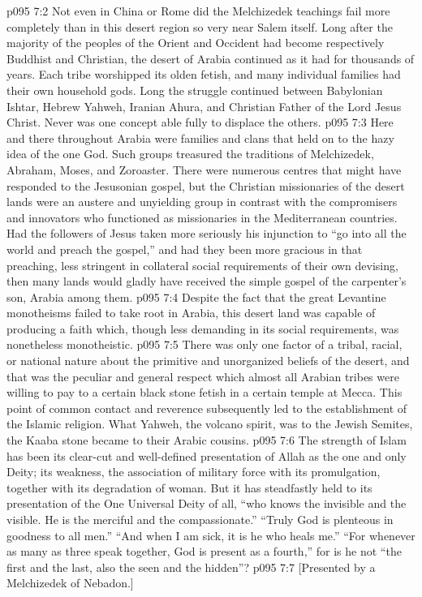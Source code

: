 \vs p095 7:2 Not even in China or Rome did the Melchizedek teachings fail more completely than in this desert region so very near Salem itself. Long after the majority of the peoples of the Orient and Occident had become respectively Buddhist and Christian, the desert of Arabia continued as it had for thousands of years. Each tribe worshipped its olden fetish, and many individual families had their own household gods. Long the struggle continued between Babylonian Ishtar, Hebrew Yahweh, Iranian Ahura, and Christian Father of the Lord Jesus Christ. Never was one concept able fully to displace the others.
\vs p095 7:3 Here and there throughout Arabia were families and clans that held on to the hazy idea of the one God. Such groups treasured the traditions of Melchizedek, Abraham, Moses, and Zoroaster. There were numerous centres that might have responded to the Jesusonian gospel, but the Christian missionaries of the desert lands were an austere and unyielding group in contrast with the compromisers and innovators who functioned as missionaries in the Mediterranean countries. Had the followers of Jesus taken more seriously his injunction to “go into all the world and preach the gospel,” and had they been more gracious in that preaching, less stringent in collateral social requirements of their own devising, then many lands would gladly have received the simple gospel of the carpenter’s son, Arabia among them.
\vs p095 7:4 Despite the fact that the great Levantine monotheisms failed to take root in Arabia, this desert land was capable of producing a faith which, though less demanding in its social requirements, was nonetheless monotheistic.
\vs p095 7:5 There was only one factor of a tribal, racial, or national nature about the primitive and unorganized beliefs of the desert, and that was the peculiar and general respect which almost all Arabian tribes were willing to pay to a certain black stone fetish in a certain temple at Mecca. This point of common contact and reverence subsequently led to the establishment of the Islamic religion. What Yahweh, the volcano spirit, was to the Jewish Semites, the Kaaba stone became to their Arabic cousins.
\vs p095 7:6 The strength of Islam has been its clear\hyp{}cut and well\hyp{}defined presentation of Allah as the one and only Deity; its weakness, the association of military force with its promulgation, together with its degradation of woman. But it has steadfastly held to its presentation of the One Universal Deity of all, “who knows the invisible and the visible. He is the merciful and the compassionate.” “Truly God is plenteous in goodness to all men.” “And when I am sick, it is he who heals me.” “For whenever as many as three speak together, God is present as a fourth,” for is he not “the first and the last, also the seen and the hidden”?
\vsetoff
\vs p095 7:7 [Presented by a Melchizedek of Nebadon.]
\quizlink
